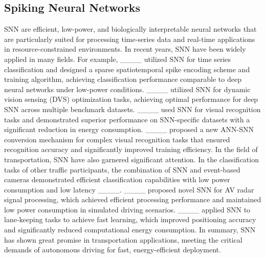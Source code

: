 \subsection{Spiking Neural Networks}
SNN are efficient, low-power, and biologically interpretable neural networks that are particularly suited for processing time-series data and real-time applications in resource-constrained environments.
In recent years, SNN have been widely applied in many fields. For example, ____ utilized SNN for time series classification and designed a sparse spatiotemporal spike encoding scheme and training algorithm, achieving classification performance comparable to deep neural networks under low-power conditions. ____ utilized SNN for dynamic vision sensing (DVS) optimization tasks, achieving optimal performance for deep SNN across multiple benchmark datasets. ____ used SNN for visual recognition tasks and demonstrated superior performance on SNN-specific datasets with a significant reduction in energy consumption. ____ proposed a new ANN-SNN conversion mechanism for complex visual recognition tasks that ensured recognition accuracy and significantly improved training efficiency.
In the field of transportation, SNN have also garnered significant attention.
In the classification tasks of other traffic participants, the combination of SNN and event-based cameras demonstrated efficient classification capabilities with low power consumption and low latency ____.
____ proposed novel SNN for AV radar signal processing, which achieved efficient processing performance and maintained low power consumption in simulated driving scenarios.
____ applied SNN to lane-keeping tasks to achieve fast learning, which improved positioning accuracy and significantly reduced computational energy consumption.
In summary, SNN has shown great promise in transportation applications, meeting the critical demands of autonomous driving for fast, energy-efficient deployment.